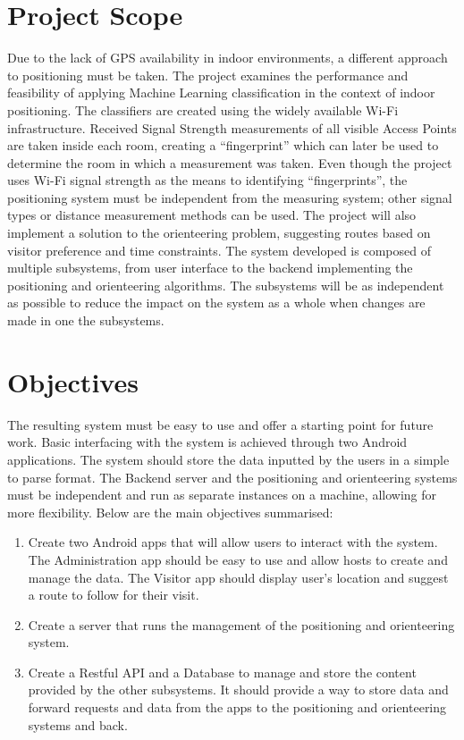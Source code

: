 \documentclass[12pt]{informatics-report}
\begin{document}
\section{Project Scope}
Due to the lack of GPS availability in indoor environments, a different approach to positioning must be taken. The project examines the performance and feasibility of applying Machine Learning classification in the context of indoor positioning. The classifiers are created using the widely available Wi-Fi infrastructure. Received Signal Strength measurements of all visible Access Points are taken inside each room, creating a “fingerprint” which can later be used to determine the room in which a measurement was taken. Even though the project uses Wi-Fi signal strength as the means to identifying “fingerprints”, the positioning system must be independent from the measuring system; other signal types or distance measurement methods can be used. The project will also implement a solution to the orienteering problem, suggesting routes based on visitor preference and time constraints. The system developed is composed of multiple subsystems, from user interface to the backend implementing the positioning and orienteering algorithms. The subsystems will be as independent as possible to reduce the impact on the system as a whole when changes are made in one the subsystems.

\section{Objectives}
The resulting system must be easy to use and offer a starting point for future work. Basic interfacing with the system is achieved through two Android applications. The system should store the data inputted by the users in a simple to parse format. The Backend server and the positioning and orienteering systems must be independent and run as separate instances on a machine, allowing for more flexibility.
Below are the main objectives summarised:
\begin{enumerate}
\item Create two Android apps that will allow users to interact with the system. The Administration app should be easy to use and allow hosts to create and manage the data. The Visitor app should display user’s location and suggest a route to follow for their visit.
\item Create a server that runs the management of the positioning and orienteering system.
\item Create a Restful API and a Database to manage and store the content provided by the other subsystems. It should provide a way to store data and forward requests and data from the apps to the positioning and orienteering systems and back.
\end{enumerate}
\end{document}
